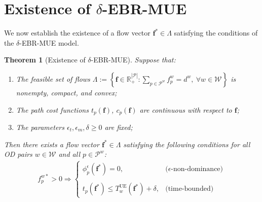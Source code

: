 \documentclass[11pt]{article}
\newtheorem{theorem}{Theorem}[section]
\begin{document}
\section{Existence of \texorpdfstring{$\delta$}{delta}-EBR-MUE}

We now establish the existence of a flow vector $\mathbf{f}^* \in \Lambda$ satisfying the conditions of the $\delta$-EBR-MUE model.

\begin{theorem}[Existence of $\delta$-EBR-MUE]
Suppose that:
\begin{enumerate}
    \item The feasible set of flows $\Lambda := \left\{ \mathbf{f} \in \mathbb{R}_+^{|\mathcal{P}|} : \sum_{p \in \mathcal{P}^w} f_p^w = d^w, \ \forall w \in \mathcal{W} \right\}$ is nonempty, compact, and convex;
    \item The path cost functions $t_p(\mathbf{f})$, $c_p(\mathbf{f})$ are continuous with respect to $\mathbf{f}$;
    \item The parameters $\epsilon_t, \epsilon_m, \delta \ge 0$ are fixed;
\end{enumerate}
Then there exists a flow vector $\mathbf{f}^* \in \Lambda$ satisfying the following conditions for all OD pairs $w \in \mathcal{W}$ and all $p \in \mathcal{P}^w$:
\begin{align*}
f_p^{w*} > 0 \Rightarrow 
\begin{cases}
\phi_p^{\epsilon}(\mathbf{f}^*) = 0, & \text{($\epsilon$-non-dominance)} \\\\
t_p(\mathbf{f}^*) \le T_w^{\mathrm{UE}}(\mathbf{f}^*) + \delta, & \text{(time-bounded)}
\end{cases}
\end{align*}
\end{theorem}
\end{document}
